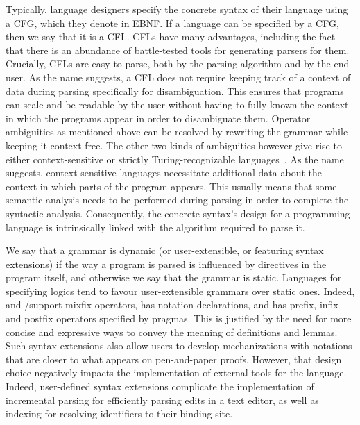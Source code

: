 

Typically, language designers specify the concrete syntax of their language using a \ac{CFG}, which they denote in \ac{EBNF}.
If a language can be specified by a \ac{CFG}, then we say that it is a \ac{CFL}.
\Acp{CFL} have many advantages, including the fact that there is an abundance of battle-tested tools for generating parsers for them.
Crucially, \acp{CFL} are easy to parse, both by the parsing algorithm and by the end user.
As the name suggests, a \ac{CFL} does not require keeping track of a context of data during parsing specifically for disambiguation.
This ensures that programs can scale and be readable by the user without having to fully known the context in which the programs appear in order to disambiguate them.
Operator ambiguities as mentioned above can be resolved by rewriting the grammar while keeping it context-free.
The other two kinds of ambiguities however give rise to either context-sensitive or strictly Turing-recognizable languages~\cite{chomsky1956three}.
As the name suggests, context-sensitive languages necessitate additional data about the context in which parts of the program appears.
This usually means that some semantic analysis needs to be performed during parsing in order to complete the syntactic analysis.
Consequently, the concrete syntax's design for a programming language is intrinsically linked with the algorithm required to parse it.


We say that a grammar is dynamic (or user-extensible, or featuring syntax extensions) if the way a program is parsed is influenced by directives in the program itself, and otherwise we say that the grammar is static.
Languages for specifying logics tend to favour user-extensible grammars over static ones.
Indeed, \Agda and \Isabelle/\HOL support mixfix operators, \Coq has notation declarations, and \Beluga has prefix, infix and postfix operators specified by pragmas.
This is justified by the need for more concise and expressive ways to convey the meaning of definitions and lemmas.
Such syntax extensions also allow users to develop mechanizations with notations that are closer to what appears on pen-and-paper proofs.
However, that design choice negatively impacts the implementation of external tools for the language.
Indeed, user-defined syntax extensions complicate the implementation of incremental parsing for efficiently parsing edits in a text editor, as well as indexing for resolving identifiers to their binding site.

